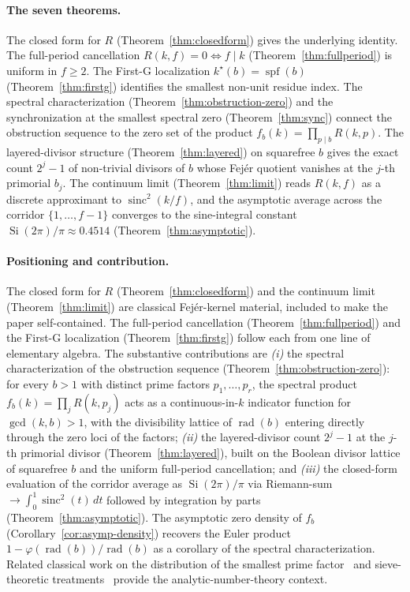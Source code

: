 \documentclass[11pt,reqno]{amsart}
\theoremstyle{plain}
\theoremstyle{definition}
\theoremstyle{remark}
\DeclareMathOperator{\spf}{spf}
\DeclareMathOperator{\sinc}{sinc}
\DeclareMathOperator{\rad}{rad}
\DeclareMathOperator{\Si}{Si}
\begin{document}
\paragraph{The seven theorems.} The closed form for $R$
(Theorem~\ref{thm:closedform}) gives the underlying identity. The
full-period cancellation $R(k, f) = 0 \Leftrightarrow f \mid k$
(Theorem~\ref{thm:fullperiod}) is uniform in $f \ge 2$. The First-G
localization $k^{\star}(b) = \spf(b)$ (Theorem~\ref{thm:firstg})
identifies the smallest non-unit residue index. The spectral
characterization (Theorem~\ref{thm:obstruction-zero}) and the
synchronization at the smallest spectral zero
(Theorem~\ref{thm:sync}) connect the obstruction sequence to the
zero set of the product $f_{b}(k) = \prod_{p \mid b} R(k, p)$. The
layered-divisor structure (Theorem~\ref{thm:layered}) on squarefree
$b$ gives the exact count $2^{j} - 1$ of non-trivial divisors of $b$
whose Fej\'{e}r quotient vanishes at the $j$-th primorial $b_{j}$.
The continuum limit (Theorem~\ref{thm:limit}) reads $R(k, f)$ as a
discrete approximant to $\sinc^{2}(k/f)$, and the asymptotic average
across the corridor $\{1, \dots, f-1\}$ converges to the sine-integral
constant $\Si(2\pi)/\pi \approx 0.4514$
(Theorem~\ref{thm:asymptotic}).

\paragraph{Positioning and contribution.} The closed form for $R$
(Theorem~\ref{thm:closedform}) and the continuum limit
(Theorem~\ref{thm:limit}) are classical Fej\'{e}r-kernel material,
included to make the paper self-contained. The full-period
cancellation (Theorem~\ref{thm:fullperiod}) and the First-G
localization (Theorem~\ref{thm:firstg}) follow each from one line of
elementary algebra. The substantive contributions are
\emph{(i)} the spectral characterization of the obstruction sequence
(Theorem~\ref{thm:obstruction-zero}): for every $b > 1$ with distinct
prime factors $p_{1}, \dots, p_{r}$, the spectral product
$f_{b}(k) = \prod_{j} R(k, p_{j})$ acts as a continuous-in-$k$
indicator function for $\gcd(k, b) > 1$, with the divisibility lattice
of $\rad(b)$ entering directly through the zero loci of the factors;
\emph{(ii)} the layered-divisor count $2^{j} - 1$ at the $j$-th
primorial divisor (Theorem~\ref{thm:layered}), built on the Boolean
divisor lattice of squarefree $b$ and the uniform full-period
cancellation; and \emph{(iii)} the closed-form evaluation of the
corridor average as $\Si(2\pi)/\pi$ via Riemann-sum
$\to \int_{0}^{1} \sinc^{2}(t)\, dt$ followed by integration by parts
(Theorem~\ref{thm:asymptotic}). The asymptotic zero density of $f_{b}$
(Corollary~\ref{cor:asymp-density}) recovers the Euler product
$1 - \varphi(\rad(b))/\rad(b)$ as a corollary of the spectral
characterization. Related classical work on the distribution of the
smallest prime factor~\cite{Erdos1959,Pomerance1985,Tenenbaum2015}
and sieve-theoretic treatments~\cite{IwaniecKowalski2004,FriedlanderIwaniec2010}
provide the analytic-number-theory context.
\end{document}
